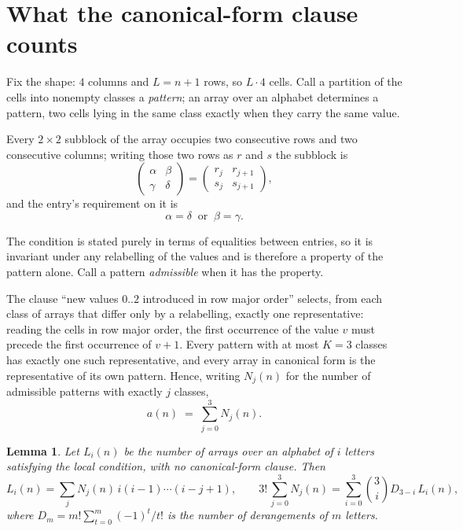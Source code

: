 \documentclass[11pt,a4paper]{article}
\theoremstyle{plain}
\newtheorem{lemma}[theorem]{Lemma}
\theoremstyle{definition}
\begin{document}
\section{What the canonical-form clause counts}

Fix the shape: $4$ columns and $L=n+1$ rows, so $L\cdot4$ cells. Call a
partition of the cells into nonempty classes a \emph{pattern}; an array over an alphabet
determines a pattern, two cells lying in the same class exactly when they carry the same
value.

Every $2\times2$ subblock of the array occupies two consecutive
rows and two consecutive columns; writing those two rows as $r$ and $s$ the
subblock is
\[
\begin{pmatrix}\alpha&\beta\\\gamma&\delta\end{pmatrix}=\begin{pmatrix}r_j&r_{j+1}\\s_j&s_{j+1}\end{pmatrix},
\]
and the entry's requirement on it is
\begin{equation}\label{eq:loc}
\alpha=\delta\ \text{ or }\ \beta=\gamma.
\end{equation}

The condition is stated purely in terms of equalities between entries, so it is invariant
under any relabelling of the values and is therefore a property of the pattern alone. Call a
pattern \emph{admissible} when it has the property.

The clause ``new values $0..2$ introduced in row major order'' selects, from each class
of arrays that differ only by a relabelling, exactly one representative: reading the cells in
row major order, the first occurrence of the value $v$ must precede the first occurrence of
$v+1$. Every pattern with at most $K=3$ classes has exactly one such representative, and
every array in canonical form is the representative of its own pattern. Hence, writing
$N_j(n)$ for the number of admissible patterns with exactly $j$ classes,
\begin{equation}\label{eq:apat}
a(n)\;=\;\sum_{j=0}^{3}N_j(n).
\end{equation}

\begin{lemma}\label{lem:inv}
Let $L_i(n)$ be the number of arrays over an alphabet of $i$ letters satisfying the local
condition, with no canonical-form clause. Then
\[
L_i(n)=\sum_j N_j(n)\,i(i-1)\cdots(i-j+1),
\qquad
3!\,\sum_{j=0}^{3}N_j(n)=\sum_{i=0}^{3}\binom{3}{i}D_{3-i}\,L_i(n),
\]
where $D_m=m!\sum_{t=0}^{m}(-1)^t/t!$ is the number of derangements of $m$ letters.
\end{lemma}
\end{document}
